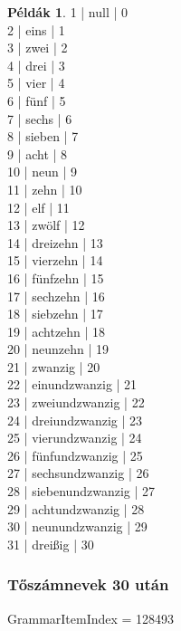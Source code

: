 \documentclass{article}
\theoremstyle{definition}
\newtheorem*{exmp}{Példák}
\begin{document}
\begin{exmp}
1 | null | 0\\
2 | eins | 1\\
3 | zwei | 2\\
4 | drei | 3\\
5 | vier | 4\\
6 | fünf | 5\\
7 | sechs | 6\\
8 | sieben | 7\\
9 | acht | 8\\
10 | neun | 9\\
11 | zehn | 10\\
12 | elf | 11\\
13 | zwölf | 12\\
14 | dreizehn | 13\\
15 | vierzehn | 14\\
16 | fünfzehn | 15\\
17 | sechzehn | 16\\
18 | siebzehn | 17\\
19 | achtzehn | 18\\
20 | neunzehn | 19\\
21 | zwanzig | 20\\
22 | einundzwanzig | 21\\
23 | zweiundzwanzig | 22\\
24 | dreiundzwanzig | 23\\
25 | vierundzwanzig | 24\\
26 | fünfundzwanzig | 25\\
27 | sechsundzwanzig | 26\\
28 | siebenundzwanzig | 27\\
29 | achtundzwanzig | 28\\
30 | neunundzwanzig | 29\\
31 | dreißig | 30\\
\end{exmp}

\subsubsection{Tőszámnevek 30 után}

GrammarItemIndex = 128493
\end{document}
